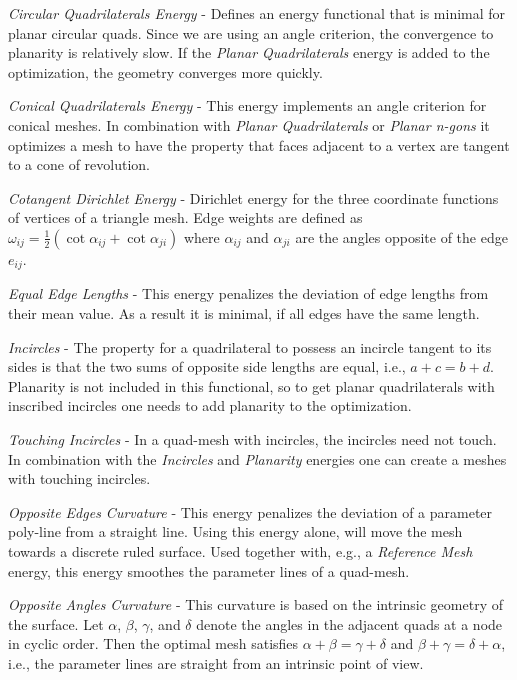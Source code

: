 \documentclass[Thesis.tex]{subfiles}
\begin{document}
\begin{compactitem}[$\bullet$]
\item \emph{Circular Quadrilaterals Energy} - Defines an energy functional that is minimal for planar circular quads. Since we are using an angle criterion, the convergence to planarity is relatively slow. If the \emph{Planar Quadrilaterals} energy is added to the optimization, the geometry converges more quickly.
\item \emph{Conical Quadrilaterals Energy} - This energy implements an angle criterion for conical meshes. In combination with \emph{Planar Quadrilaterals} or \emph{Planar n-gons} it optimizes a mesh to have the property that faces adjacent to a vertex are tangent to a cone of revolution.
\item \emph{Cotangent Dirichlet Energy} - Dirichlet energy for the three coordinate functions of vertices of a triangle mesh. Edge weights are defined as $\omega_\mathit{ij}=\frac{1}{2}(\cot\alpha_\mathit{ij}+\cot\alpha_\mathit{ji})$ where $\alpha_\mathit{ij}$ and $\alpha_\mathit{ji}$ are the angles opposite of the edge $e_\mathit{ij}$.
\item \emph{Equal Edge Lengths} - This energy penalizes the deviation of edge lengths from their mean value. As a result it is minimal, if all edges have the same length.
\item \emph{Incircles} - The property for a quadrilateral to possess an incircle tangent to its sides is that the two sums of opposite side lengths are equal, i.e., $a+c=b+d$. Planarity is not included in this functional, so to get planar quadrilaterals with inscribed incircles one needs to add planarity to the optimization.
\item \emph{Touching Incircles} - In a quad-mesh with incircles, the incircles need not touch. In combination with the \emph{Incircles} and \emph{Planarity} energies one can create a meshes with touching incircles.
\item \emph{Opposite Edges Curvature} - This energy penalizes the deviation of a parameter poly-line from a straight line. Using this energy alone, will move the mesh towards a discrete ruled surface. Used together with, e.g., a \emph{Reference Mesh} energy, this energy smoothes the  parameter lines of a quad-mesh.
\item \emph{Opposite Angles Curvature} - This curvature is based on the intrinsic geometry of the surface. Let $\alpha$, $\beta$, $\gamma$, and $\delta$ denote the angles in the adjacent quads at a node in cyclic order. Then the optimal mesh satisfies $\alpha+\beta=\gamma+\delta$ and $\beta+\gamma=\delta+\alpha$, i.e., the parameter lines are straight from an intrinsic point of view.

\end{compactitem}
\end{document}
